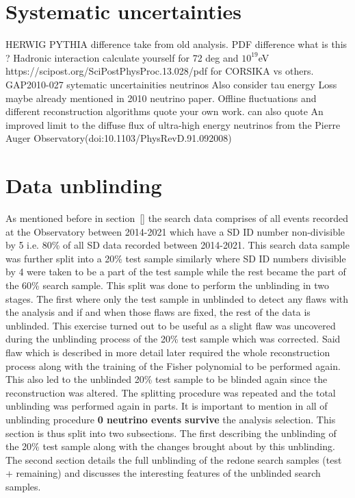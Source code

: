 \section{Systematic uncertainties}
\label{sec:det_uncert}
HERWIG PYTHIA difference take from old analysis.
PDF difference what is this ?
Hadronic interaction calculate yourself for 72 deg and $10^{19}$eV
https://scipost.org/SciPostPhysProc.13.028/pdf for CORSIKA vs others.
GAP2010-027 sytematic uncertainities neutrinos 
Also consider tau energy Loss maybe already mentioned in 2010 neutrino paper. 
Offline fluctuations and different reconstruction algorithms quote your own work.
can also quote An improved limit to the diffuse flux of ultra-high energy neutrinos
from the Pierre Auger Observatory(doi:10.1103/PhysRevD.91.092008) 
\section{Data unblinding}
\label{sec:data_unblinding}
As mentioned before in section~\ref{} the search data comprises of all events recorded at the Observatory between 2014-2021 which have a SD ID number non-divisible by 5 i.e. 80\% of all SD data recorded between 2014-2021. This search data sample was further split into a 20\% test sample similarly where SD ID numbers divisible by 4 were taken to be a part of the test sample while the rest became the part of the 60\% search sample. This split was done to perform the unblinding in two stages. The first where only the test sample in unblinded to detect any flaws with the analysis and if and when those flaws are fixed, the rest of the data is unblinded. This exercise turned out to be useful as a slight flaw was uncovered during the unblinding process of the 20\% test sample which was corrected. Said flaw which is described in more detail later required the whole reconstruction process along with the training of the Fisher polynomial to be performed again. This also led to the unblinded 20\% test sample to be blinded again since the reconstruction was altered. The splitting procedure was repeated and the total unblinding was performed again in parts. It is important to mention in all of unblinding procedure \textbf{0 neutrino events survive} the analysis selection.
This section is thus split into two subsections. The first describing the unblinding of the 20\% test sample along with the changes brought about by this unblinding. The second section details the full unblinding of the redone search samples (test + remaining) and discusses the interesting features of the unblinded search samples. 

